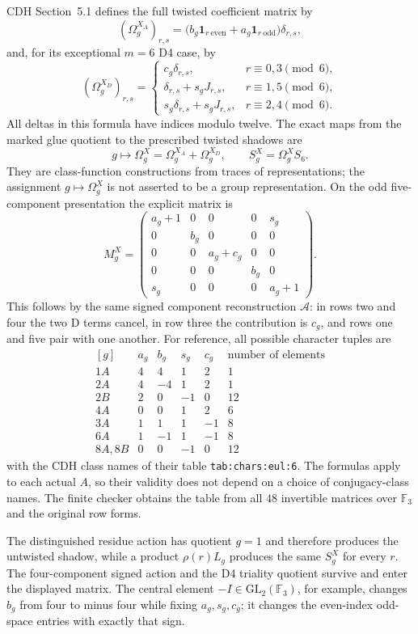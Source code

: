 CDH Section~5.1 \cite[Section~5.1]{esn:CDH2014} defines the full
twisted coefficient matrix by
\[
 (\Omega_g^{X_A})_{r,s}
 =\bigl(b_g\mathbf1_{r\ \text{even}}+
          a_g\mathbf1_{r\ \text{odd}}\bigr)\delta_{r,s},
\]
and, for its exceptional $m=6$ D4 case, by
\[
 (\Omega_g^{X_D})_{r,s}=
 \begin{cases}
 c_g\delta_{r,s},&r\equiv0,3\pmod6,\\
 \delta_{r,s}+s_gJ_{r,s},&r\equiv1,5\pmod6,\\
 s_g\delta_{r,s}+s_gJ_{r,s},&r\equiv2,4\pmod6.
 \end{cases}
\]
All deltas in this formula have indices modulo twelve.  The exact maps
from the marked glue quotient to the prescribed twisted shadows are
\[
 g\longmapsto\Omega_g^X=\Omega_g^{X_A}+\Omega_g^{X_D},\qquad
 S_g^X=\Omega_g^XS_6.
\]
They are class-function constructions from traces of representations;
the assignment $g\mapsto\Omega_g^X$ is not asserted to be a group
representation.  On the odd five-component presentation the explicit
matrix is
\[
 \boxed{M_g^X=\begin{pmatrix}
 a_g+1&0&0&0&s_g\\
 0&b_g&0&0&0\\
 0&0&a_g+c_g&0&0\\
 0&0&0&b_g&0\\
 s_g&0&0&0&a_g+1
 \end{pmatrix}.}
\]
This follows by the same signed component reconstruction $\mathcal A$:
in rows two and four the two D terms cancel, in row three the contribution
is $c_g$, and rows one and five pair with one another.
For reference, all possible character tuples are
\[
\begin{array}{c|rrrr|r}
 [g]&a_g&b_g&s_g&c_g&\text{number of elements}\\\hline
 1A&4&4&1&2&1\\
 2A&4&-4&1&2&1\\
 2B&2&0&-1&0&12\\
 4A&0&0&1&2&6\\
 3A&1&1&1&-1&8\\
 6A&1&-1&1&-1&8\\
 8A,8B&0&0&-1&0&12
\end{array}
\]
with the CDH class names of their table
\texttt{tab:chars:eul:6}.  The formulas apply to each actual $A$, so
their validity does not depend on a choice of conjugacy-class names.
The finite checker obtains the table from all $48$ invertible matrices
over $\mathbb F_3$ and the original row forms.

The distinguished residue action has quotient $g=1$ and therefore
produces the untwisted shadow, while a product $\rho(r)L_g$ produces
the same $S_g^X$ for every $r$.  The four-component signed action and
the D4 triality quotient survive and enter the displayed matrix.  The
central element $-I\in\mathrm{GL}_2(\mathbb F_3)$, for example,
changes $b_g$ from four to minus four while fixing $a_g,s_g,c_g$;
it changes the even-index odd-space entries with exactly that sign.

